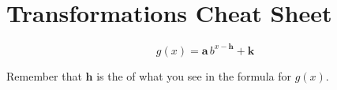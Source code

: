 \section{Transformations Cheat Sheet}

\begin{tcolorbox}[center,colback=white,width=4.5in,valign=center,]
{
    \vspace{-0.25\onelineskip}
    \begin{equation*}
        g(x) = \bm{a} \, b^{x - \bm{h}} + \bm{k}
    \end{equation*}
}
\end{tcolorbox}
\begin{myWarningBox}
    \begin{center}
        Remember that $\bm{h}$ is the  
        of what you see in the formula for $g(x)$.
    \end{center}
\end{myWarningBox}


